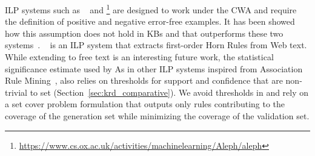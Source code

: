 

ILP systems such as ~\cite{dehaspe1999discovery} and \footnote{\url{https://www.cs.ox.ac.uk/activities/machinelearning/Aleph/aleph}} are designed to work under the CWA and require the definition of positive and negative error-free examples.
It has been showed how this assumption does not hold in KBs and that  \amie outperforms these two systems~\cite{galarraga2015fast}. 
~\cite{schoenmackers2010learning} is an ILP system that extracts first-order Horn Rules 
from Web text. While extending \krd to free text %
is an interesting future work, the statistical significance estimate used by 
As in other ILP systems inspired from Association Rule Mining~\cite{agrawal1993mining}, also  relies on thresholds for support and confidence that are non-trivial to set (Section~\ref{sec:krd_comparative}). We avoid thresholds in \krd and rely on a set cover problem formulation that outputs only rules contributing to the coverage of the generation set while minimizing the coverage of the validation set.

